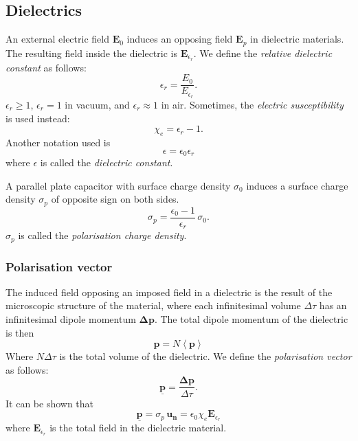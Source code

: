 \documentclass[a4paper, 12pt]{article}
\renewcommand{\vec}[1]{\mathbf{#1}}
\newcommand{\E}{\ensuremath{\vec{E}}}
\newcommand{\e}{\ensuremath{\epsilon_0}}
\newcommand{\p}{\ensuremath{\vec{\underline{p}}}}
\begin{document}
\subsection{Dielectrics}    
    An external electric field $\E_0$ induces an opposing field $\E_p$ in dielectric materials. The resulting field inside the dielectric is $\E_{\epsilon_r}$. We define the \textit{relative dielectric constant} as follows: 
    \begin{equation}
        \epsilon_r = \frac{E_0}{E_{\epsilon_r}}.
    \end{equation}
    $\epsilon_r \geq 1$,  $\epsilon_r = 1$ in vacuum, and $\epsilon_r \approx 1$ in air.
    Sometimes, the \textit{electric susceptibility} is used instead:
    \begin{equation}
        \chi_e = \epsilon_r -1.
    \end{equation}
    Another notation used is 
    \begin{equation}
        \epsilon = \e\epsilon_r
    \end{equation}
    where $\epsilon$ is called the \textit{dielectric constant}.
    
    A parallel plate capacitor with surface charge density $\sigma_0$ induces a surface charge density $\sigma_p$ of opposite sign on both sides. 
    \begin{equation}
        \sigma_p = \frac{\e -1}{\epsilon_r}\,\sigma_0.
    \end{equation}
    $\sigma_p$ is called the \textit{polarisation charge density}.
    
    \subsubsection{Polarisation vector}
        The induced field opposing an imposed field in a dielectric is the result of the microscopic structure of the material, where each infinitesimal volume $\Delta \tau$ has an infinitesimal dipole momentum $\vec{\Delta p}$. The total dipole momentum of the dielectric is then 
        \begin{equation}
            \vec{p} = N\left< \vec{p} \right>
        \end{equation}
        Where $N\Delta \tau$ is the total volume of the dielectric. We define the \textit{polarisation vector} as follows:
        \begin{equation}
            \p = \frac{\vec{\Delta p}}{\Delta \tau}.
        \end{equation}
        It can be shown that 
        \begin{equation}
            \p = \sigma_p\,\vec{u_n} = \e \chi_e \E_{\epsilon_r}
        \end{equation}
        where $\E_{\epsilon_r}$ is the total field in the dielectric material.
        
\end{document}
